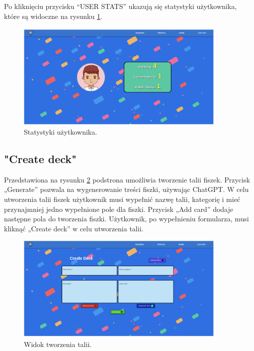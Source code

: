 Po kliknięciu przycisku “USER STATS” ukazują się statystyki użytkownika, które są widoczne na rysunku \ref{img:web_stats}.

\begin{figure}[H]
    \centering
    \includegraphics[width=0.9\textwidth]{chapters/chapter_10/images_web/web_stats}
    \caption{Statystyki użytkownika.}
    \label{img:web_stats}
\end{figure}


\subsection{"Create deck"}
Przedstawiona na rysunku \ref{img:web_create_deck} podstrona umożliwia tworzenie talii fiszek. Przycisk „Generate” pozwala na wygenerowanie treści fiszki, używając ChatGPT. W celu utworzenia talii fiszek użytkownik musi wypełnić nazwę talii, kategorię i mieć przynajmniej jedno wypełnione pole dla fiszki. Przycisk „Add card” dodaje następne pola do tworzenia fiszki. Użytkownik, po wypełnieniu formularza, musi kliknąć „Create deck” w celu utworzenia talii.


\begin{figure}[H]
    \centering
    \includegraphics[width=0.9\textwidth]{chapters/chapter_10/images_web/web_create_deck}
    \caption{Widok tworzenia talii.}
    \label{img:web_create_deck}
\end{figure}


